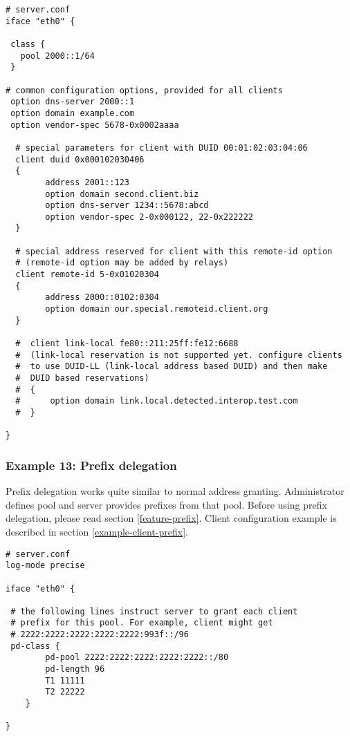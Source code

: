 \begin{lstlisting}
# server.conf
iface "eth0" {

 class {
   pool 2000::1/64
 }

# common configuration options, provided for all clients
 option dns-server 2000::1
 option domain example.com
 option vendor-spec 5678-0x0002aaaa

  # special parameters for client with DUID 00:01:02:03:04:06
  client duid 0x000102030406
  {
        address 2001::123
        option domain second.client.biz
        option dns-server 1234::5678:abcd
        option vendor-spec 2-0x000122, 22-0x222222
  }

  # special address reserved for client with this remote-id option
  # (remote-id option may be added by relays)
  client remote-id 5-0x01020304
  {
        address 2000::0102:0304
        option domain our.special.remoteid.client.org
  }

  #  client link-local fe80::211:25ff:fe12:6688
  #  (link-local reservation is not supported yet. configure clients
  #  to use DUID-LL (link-local address based DUID) and then make
  #  DUID based reservations)
  #  {
  #      option domain link.local.detected.interop.test.com
  #  }

}
\end{lstlisting}

\subsubsection{Example 13: Prefix delegation}
\label{example-server-prefix}

Prefix delegation works quite similar to normal address granting.
Administrator defines pool and server provides prefixes from that
pool. Before using prefix delegation, please read section
\ref{feature-prefix}. Client configuration example is described in section
\ref{example-client-prefix}.

\begin{lstlisting}
# server.conf
log-mode precise

iface "eth0" {

 # the following lines instruct server to grant each client
 # prefix for this pool. For example, client might get
 # 2222:2222:2222:2222:2222:993f::/96
 pd-class {
        pd-pool 2222:2222:2222:2222:2222::/80
        pd-length 96
        T1 11111
        T2 22222
    }

}
\end{lstlisting}

